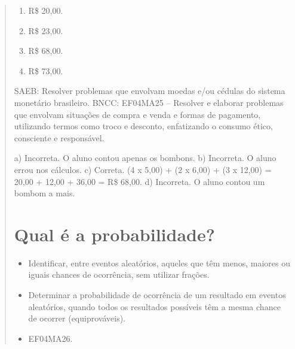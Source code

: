 \begin{mdframed}[linewidth=2pt,linecolor=salmao,roundcorner=2pt]
\begin{itemize}
{\begin{itemize}
\begin{escolha}
{\begin{quote}
{\begin{escolha}
\begin{enumerate}
\item
  R\$ 20,00.
\item
  R\$ 23,00.
\item
  R\$ 68,00.
\item
  R\$ 73,00.
\end{enumerate}

SAEB: Resolver problemas que envolvam moedas e/ou cédulas do sistema monetário brasileiro.
BNCC: EF04MA25 -- Resolver e elaborar problemas que envolvam situações de compra e venda e formas
de pagamento, utilizando termos como troco e desconto, enfatizando o consumo ético, consciente e
responsável.

a) Incorreta. O aluno contou apenas os bombons.
b) Incorreta. O aluno errou nos cálculos.
c) Correta. (4 x 5,00) + (2 x 6,00) + (3 x 12,00) = 20,00 + 12,00 + 36,00 = R\$ 68,00.
d) Incorreta. O aluno contou um bombom a mais.


\chapter{Qual é a probabilidade?}


\begin{itemize}
\item Identificar, entre eventos aleatórios, aqueles que têm menos, maiores ou
iguais chances de ocorrência, sem utilizar frações.
\item Determinar a probabilidade de ocorrência de um resultado em eventos
aleatórios, quando todos os resultados possíveis têm a mesma chance de
ocorrer (equiprováveis).
\end{itemize}


\begin{itemize}
\item EF04MA26.
\end{itemize}

\end{escolha}}
\end{quote}}
\end{escolha}
\end{itemize}}
\end{itemize}
\end{mdframed}
